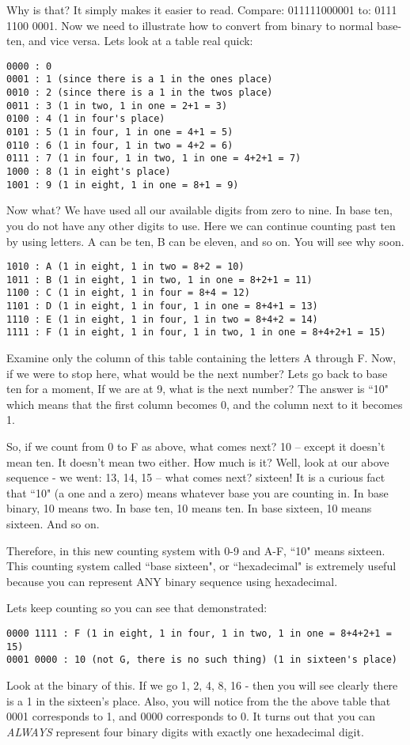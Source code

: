 \documentclass[a4paper,12pt]{article}
\begin{document}
Why is that? It simply makes it easier to read. Compare: 011111000001 to: 0111 1100 0001. Now we need to illustrate how to convert from binary to normal base-ten, and vice versa. Lets look at a table real quick:
\begin{lstlisting}
0000 : 0
0001 : 1 (since there is a 1 in the ones place)
0010 : 2 (since there is a 1 in the twos place)
0011 : 3 (1 in two, 1 in one = 2+1 = 3)
0100 : 4 (1 in four's place)
0101 : 5 (1 in four, 1 in one = 4+1 = 5)
0110 : 6 (1 in four, 1 in two = 4+2 = 6)
0111 : 7 (1 in four, 1 in two, 1 in one = 4+2+1 = 7)
1000 : 8 (1 in eight's place)
1001 : 9 (1 in eight, 1 in one = 8+1 = 9)
\end{lstlisting}
Now what? We have used all our available digits from zero to nine. In base ten, you do not have any other digits to use. Here we can continue counting past ten by using letters. A can be ten, B can be eleven, and so on. You will see why soon.
\begin{lstlisting}
1010 : A (1 in eight, 1 in two = 8+2 = 10)
1011 : B (1 in eight, 1 in two, 1 in one = 8+2+1 = 11)
1100 : C (1 in eight, 1 in four = 8+4 = 12)
1101 : D (1 in eight, 1 in four, 1 in one = 8+4+1 = 13)
1110 : E (1 in eight, 1 in four, 1 in two = 8+4+2 = 14)
1111 : F (1 in eight, 1 in four, 1 in two, 1 in one = 8+4+2+1 = 15)
\end{lstlisting}
Examine only the column of this table containing the letters A through F. Now, if we were to stop here, what would be the next number? Lets go back to base ten for a moment, If we are at 9, what is the next number? The answer is ``10" which means that the first column becomes 0, and the column next to it becomes 1.

So, if we count from 0 to F as above, what comes next? 10 -- except it doesn't mean ten. It doesn't mean two either. How much is it? Well, look at our above sequence - we went: 13, 14, 15 -- what comes next? sixteen! It is a curious fact that ``10" (a one and a zero) means whatever base you are counting in. In base binary, 10 means two. In base ten, 10 means ten. In base sixteen, 10 means sixteen. And so on.

Therefore, in this new counting system with 0-9 and A-F, ``10" means sixteen. This counting system called ``base sixteen", or ``hexadecimal" is extremely useful because you can represent ANY binary sequence using hexadecimal.

Lets keep counting so you can see that demonstrated:
\begin{lstlisting}
0000 1111 : F (1 in eight, 1 in four, 1 in two, 1 in one = 8+4+2+1 = 15)
0001 0000 : 10 (not G, there is no such thing) (1 in sixteen's place)
\end{lstlisting}
Look at the binary of this. If we go 1, 2, 4, 8, 16 - then you will see clearly there is a 1 in the sixteen's place. Also, you will notice from the the above table that 0001 corresponds to 1, and 0000 corresponds to 0. It turns out that you can \emph{ALWAYS} represent four binary digits with exactly one hexadecimal digit.
\end{document}
